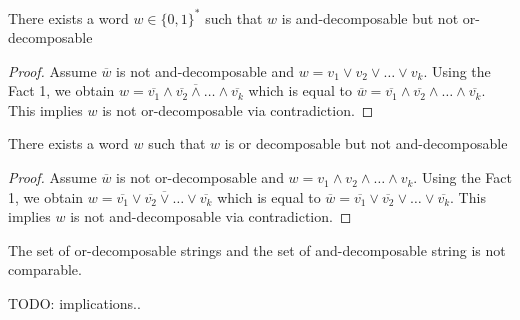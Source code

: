 \begin{theorem}
	There exists a word $w \in \{0,1\}^*$ such that $w$ is and-decomposable but not or-decomposable
\end{theorem}

\begin{proof}
	Assume $\overbar{w}$ is not and-decomposable and $w = v_1 \lor v_2 \lor \dots \lor v_k$.
	Using the Fact 1, we obtain $w = \overbar{\overbar{v_1} \land \overbar{v_2} \land \dots \land \overbar{v_k}}$ which is equal to $\overbar{w} = \overbar{v_1} \land \overbar{v_2} \land \dots \land \overbar{v_k}$.
	This implies $w$ is not or-decomposable via contradiction.
\end{proof}


\begin{theorem}
	There exists a word $w$ such that $w$ is or decomposable but not and-decomposable
\end{theorem}

\begin{proof}
	Assume $\overbar{w}$ is not or-decomposable and $w = v_1 \land v_2 \land \dots \land v_k$.
	Using the Fact 1, we obtain $w = \overbar{\overbar{v_1} \lor \overbar{v_2} \lor \dots \lor \overbar{v_k}}$ which is equal to $\overbar{w} = \overbar{v_1} \lor \overbar{v_2} \lor \dots \lor \overbar{v_k}$.
	This implies $w$ is not and-decomposable via contradiction.
\end{proof}

\begin{corollary}
	The set of or-decomposable strings and the set of and-decomposable string is not comparable.
\end{corollary}


TODO: implications..



